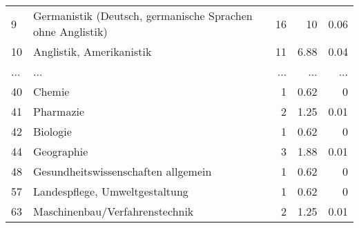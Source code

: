 \begin{longtable}{lXrrr}
        9 & \multicolumn{1}{X}{Germanistik (Deutsch, germanische Sprachen ohne Anglistik)} & %
          \num{16} &
          \num[round-mode=places,round-precision=2]{10} &
          \num[round-mode=places,round-precision=2]{0.06} \\
        10 & \multicolumn{1}{X}{Anglistik, Amerikanistik} & %
          \num{11} &
          \num[round-mode=places,round-precision=2]{6.88} &
          \num[round-mode=places,round-precision=2]{0.04} \\
       ... & ... & ... & ... & ... \\
        40 & \multicolumn{1}{X}{Chemie} & %
          \num{1} &
          \num[round-mode=places,round-precision=2]{0.62} &
          \num[round-mode=places,round-precision=2]{0} \\

        41 & \multicolumn{1}{X}{Pharmazie} & %
          \num{2} &
          \num[round-mode=places,round-precision=2]{1.25} &
          \num[round-mode=places,round-precision=2]{0.01} \\

        42 & \multicolumn{1}{X}{Biologie} & %
          \num{1} &
          \num[round-mode=places,round-precision=2]{0.62} &
          \num[round-mode=places,round-precision=2]{0} \\

        44 & \multicolumn{1}{X}{Geographie} & %
          \num{3} &
          \num[round-mode=places,round-precision=2]{1.88} &
          \num[round-mode=places,round-precision=2]{0.01} \\

        48 & \multicolumn{1}{X}{Gesundheitswissenschaften allgemein} & %
          \num{1} &
          \num[round-mode=places,round-precision=2]{0.62} &
          \num[round-mode=places,round-precision=2]{0} \\

        57 & \multicolumn{1}{X}{Landespflege, Umweltgestaltung} & %
          \num{1} &
          \num[round-mode=places,round-precision=2]{0.62} &
          \num[round-mode=places,round-precision=2]{0} \\

        63 & \multicolumn{1}{X}{Maschinenbau/Verfahrenstechnik} & %
          \num{2} &
          \num[round-mode=places,round-precision=2]{1.25} &
          \num[round-mode=places,round-precision=2]{0.01} \\


\end{longtable}
